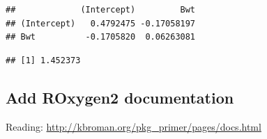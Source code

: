 \documentclass[]{book}
\newenvironment{Shaded}{\begin{snugshade}}{\end{snugshade}}
\newcommand{\KeywordTok}[1]{\textcolor[rgb]{0.13,0.29,0.53}{\textbf{#1}}}
\newcommand{\OperatorTok}[1]{\textcolor[rgb]{0.81,0.36,0.00}{\textbf{#1}}}
\newcommand{\NormalTok}[1]{#1}
\theoremstyle{definition}
\theoremstyle{definition}
\theoremstyle{definition}
\theoremstyle{remark}
\begin{document}
\begin{verbatim}
##             (Intercept)         Bwt
## (Intercept)   0.4792475 -0.17058197
## Bwt          -0.1705820  0.06263081
\end{verbatim}

\begin{Shaded}
\end{Shaded}

\begin{verbatim}
## [1] 1.452373
\end{verbatim}

\subsection{Add ROxygen2
documentation}\label{add-roxygen2-documentation}

Reading: \url{http://kbroman.org/pkg_primer/pages/docs.html}
\end{document}
